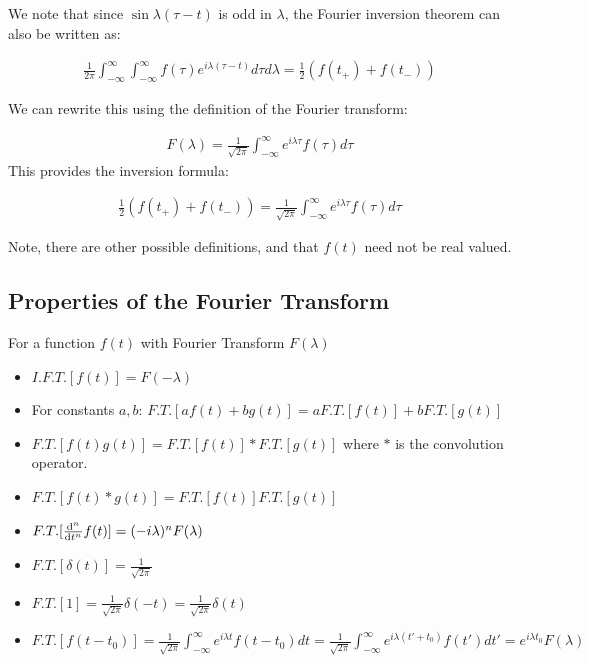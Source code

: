 \documentclass{article}
\theoremstyle{definition}
\begin{document}
We note that since $\sin \lambda (\tau-t)$ is odd in $\lambda$, the Fourier inversion theorem can also be written as:

\begin{align*}
\frac{1}{2\pi} \int_{-\infty}^\infty \int_{-\infty}^\infty f(\tau) e^{i \lambda (\tau - t)}  d\tau d\lambda 
=\frac{1}{2} \left(f(t_+) + f(t_-)\right) 
\end{align*}

We can rewrite this using the definition of the Fourier transform:

\begin{align*}
F(\lambda) = \frac{1}{\sqrt{2\pi}} \int_{-\infty}^\infty e^{i \lambda \tau} f(\tau) d\tau
\end{align*}
This provides the inversion formula:

\begin{align*}
\frac{1}{2} \left(f(t_+) + f(t_-)\right) = \frac{1}{\sqrt{2\pi}} \int_{-\infty}^\infty e^{i \lambda \tau} f(\tau) d\tau
\end{align*}

Note, there are other possible definitions, and that $f(t)$ need not be real valued.

\subsection{Properties of the Fourier Transform}
For a function $f(t)$ with Fourier Transform $F(\lambda)$
\begin{itemize}
	\item $I.F.T.[f(t)] = F(-\lambda)$
	\item For constants $a,b$: $F.T.[af(t)+bg(t)] = a F.T.[f(t)] + b F.T.[g(t)] $
	\item $F.T.[f(t)g(t)] = F.T.[f(t)] * F.T.[g(t)]$  where $*$ is the convolution operator.
	\item $F.T.[f(t) * g(t)] = F.T.[f(t)] F.T.[g(t)]$
	\item $F.T.[\dv{^n}{t^n} f(t)] = (-i\lambda)^n F(\lambda)$
	\item $F.T.[\delta(t)] = \frac{1}{\sqrt{2\pi}}$
	\item $F.T.[1] = \frac{1}{\sqrt{2\pi}}\delta(-t) = \frac{1}{\sqrt{2\pi}}\delta(t)$
	\item $F.T.[f(t-t_0)] = \frac{1}{\sqrt{2\pi}}  \int_{-\infty}^\infty e^{i \lambda t} f(t-t_0) dt = \frac{1}{\sqrt{2\pi}}  \int_{-\infty}^\infty e^{i \lambda (t'+t_0)} f(t') dt' = e^{i \lambda t_0} F(\lambda)$
\end{itemize}
\end{document}
